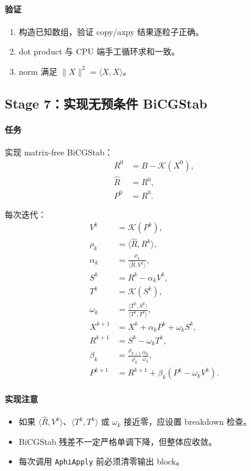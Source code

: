 \documentclass[UTF8,a4paper,11pt]{ctexart}
\newcommand{\code}[1]{\texttt{#1}}
\newcommand{\Kop}{\mathcal K}
\begin{document}
\paragraph{验证}
\begin{enumerate}
  \item 构造已知数组，验证 copy/axpy 结果逐粒子正确。
  \item dot product 与 CPU 端手工循环求和一致。
  \item norm 满足 $\|X\|^2=\langle X,X\rangle$。
\end{enumerate}

\subsection{Stage 7：实现无预条件 BiCGStab}

\paragraph{任务}
实现 matrix-free BiCGStab：
\begin{align}
R^0&=B-\Kop(X^0),\\
\hat R&=R^0,\\
P^0&=R^0.
\end{align}

每次迭代：
\begin{align}
V^k&=\Kop(P^k),\\
\rho_k&=\langle \hat R,R^k\rangle,\\
\alpha_k&=\frac{\rho_k}{\langle \hat R,V^k\rangle},\\
S^k&=R^k-\alpha_k V^k,\\
T^k&=\Kop(S^k),\\
\omega_k&=\frac{\langle T^k,S^k\rangle}{\langle T^k,T^k\rangle},\\
X^{k+1}&=X^k+\alpha_kP^k+\omega_kS^k,\\
R^{k+1}&=S^k-\omega_kT^k,\\
\beta_k&=\frac{\rho_{k+1}}{\rho_k}\frac{\alpha_k}{\omega_k},\\
P^{k+1}&=R^{k+1}+\beta_k(P^k-\omega_kV^k).
\end{align}

\paragraph{实现注意}
\begin{itemize}
  \item 如果 $\langle \hat R,V^k\rangle$、$\langle T^k,T^k\rangle$ 或 $\omega_k$ 接近零，应设置 breakdown 检查。
  \item BiCGStab 残差不一定严格单调下降，但整体应收敛。
  \item 每次调用 \code{AphiApply} 前必须清零输出 block。
\end{itemize}
\end{document}
